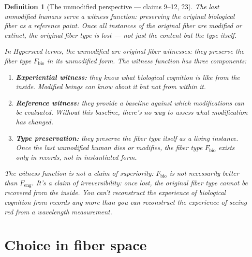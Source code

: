 \documentclass[11pt,a4paper]{article}
\newtheorem{definition}{Definition}[section]
\begin{document}
\begin{definition}[The unmodified perspective --- claims 9--12, 23]
\label{def:witness}
The last unmodified humans serve a witness function: preserving the
original biological fiber as a reference point. Once all instances of
the original fiber are modified or extinct, the original fiber type is
lost --- not just the content but the type itself.

In Hyperseed terms, the unmodified are \emph{original fiber witnesses}:
they preserve the fiber type $F_{\text{bio}}$ in its unmodified form.
The witness function has three components:
\begin{enumerate}
\item \textbf{Experiential witness:} they know what biological cognition
  is like from the inside. Modified beings can know \emph{about} it
  but not \emph{from within} it.
\item \textbf{Reference witness:} they provide a baseline against which
  modifications can be evaluated. Without this baseline, there's no
  way to assess what modification has changed.
\item \textbf{Type preservation:} they preserve the fiber type itself
  as a living instance. Once the last unmodified human dies or modifies,
  the fiber type $F_{\text{bio}}$ exists only in records, not in
  instantiated form.
\end{enumerate}

The witness function is not a claim of superiority: $F_{\text{bio}}$
is not necessarily better than $F_{\text{eng}}$. It's a claim of
\emph{irreversibility}: once lost, the original fiber type cannot be
recovered from the inside. You can't reconstruct the experience of
biological cognition from records any more than you can reconstruct the
experience of seeing red from a wavelength measurement.
\end{definition}

\section{Choice in fiber space}
\label{sec:choice}
\end{document}
